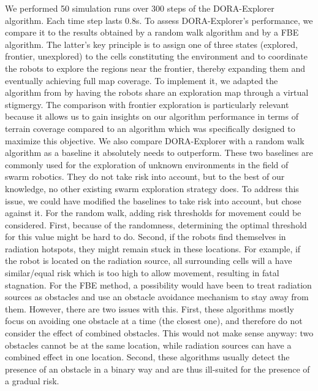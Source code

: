 \documentclass[letterpaper, 10 pt, conference]{ieeeconf}
\begin{document}
We performed 50 simulation runs over 300 steps of the DORA-Explorer
algorithm. Each time step lasts 0.8s. To assess DORA-Explorer's performance, we compare it to the results
obtained by a random walk algorithm and by a FBE algorithm. The
latter's key principle is to assign one of three states (explored,
frontier, unexplored) to the cells constituting the environment and to
coordinate the robots to explore the regions near the frontier,
thereby expanding them and eventually achieving full map coverage. To
implement it, we adapted the algorithm from
\cite{yamauchi1998frontier} by having the robots share an exploration
map through a virtual stigmergy. The comparison with frontier exploration is
particularly relevant because it allows us to gain insights on our
algorithm performance in terms of terrain coverage compared to an
algorithm which was specifically designed to maximize this
objective. We also compare DORA-Explorer with a random walk algorithm as a
baseline it absolutely needs to outperform. These two baselines are
commonly used for the exploration of unknown environments in the field
of swarm robotics. They do not take risk into account, but to the best
of our knowledge, no other existing swarm exploration strategy does. To address this issue, we could have modified the baselines to take risk into account, but chose against it. For the random walk, adding risk thresholds for movement could be considered. First, because of the randomness, determining the optimal threshold for this value might be hard to do. Second, if the robots find themselves in radiation hotspots, they might remain stuck in these locations. For example, if the robot is located on the radiation source, all surrounding cells will a have similar/equal risk which is too high to allow movement, resulting in fatal stagnation. For the FBE method, a possibility would have been to treat radiation sources as obstacles and use an obstacle avoidance mechanism to stay away from them.
However, there are two issues with this. First, these algorithms mostly focus on avoiding one obstacle at a time (the closest one), and therefore do not consider the effect of combined obstacles. This would not make sense anyway: two obstacles cannot be at the same location, while radiation sources can have a combined effect in one location. Second, these algorithms usually detect the presence of an obstacle in a binary way and are thus ill-suited for the presence of a gradual risk.
\end{document}
